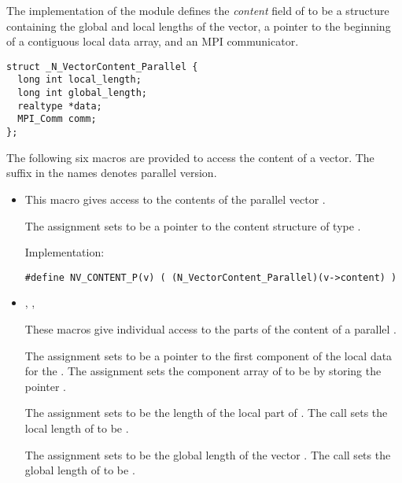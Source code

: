 %
The {\nvecp} implementation of the {\nvector} module defines the {\em content} 
field of  to be a structure containing the global and local lengths 
of the vector, a pointer to the beginning of a contiguous local data array, and
an MPI communicator.
\begin{verbatim} 
struct _N_VectorContent_Parallel {
  long int local_length;
  long int global_length;
  realtype *data;
  MPI_Comm comm;
};
\end{verbatim}
The following six macros are provided to access the content of a {\nvecp}
vector. The suffix  in the names denotes parallel version.
\begin{itemize}

\item {}

  This macro gives access to the contents of the parallel
  vector .
  
  The assignment  sets       
   to be a pointer to the  content    
  structure of type .
  
  Implementation:
  
  \verb|#define NV_CONTENT_P(v) ( (N_VectorContent_Parallel)(v->content) )|
  
\item {}, , 
  
  These macros give individual access to the parts of    
  the content of a parallel .                        
  
  The assignment  sets  to be     
  a pointer to the first component of the local data for the  . 
  The assignment  sets the component array of 
   to be  by storing the pointer .                   
  
  The assignment  sets  to be     
  the length of the local part of . 
  The call  sets      
  the local length of  to be .
  
  The assignment  sets  to  
  be the global length of the vector .                    
  The call  sets the global       
  length of  to be .
  

\end{itemize}
